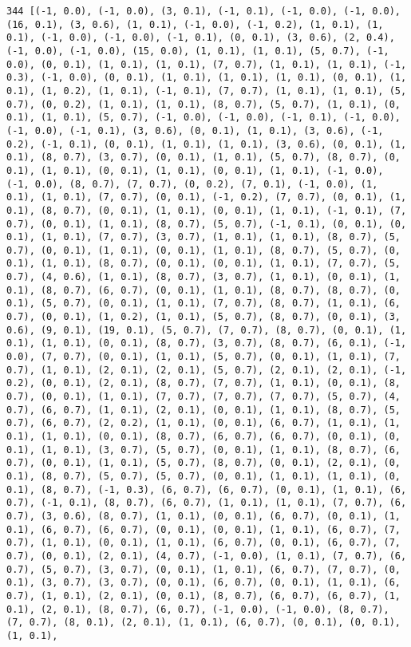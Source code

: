 \documentclass[11pt]{article}
\begin{document}
\begin{Verbatim}[commandchars=\\\{\}]
344 [(-1, 0.0), (-1, 0.0), (3, 0.1), (-1, 0.1), (-1, 0.0), (-1, 0.0), (16, 0.1), (3, 0.6), (1, 0.1), (-1, 0.0), (-1, 0.2), (1, 0.1), (1, 0.1), (-1, 0.0), (-1, 0.0), (-1, 0.1), (0, 0.1), (3, 0.6), (2, 0.4), (-1, 0.0), (-1, 0.0), (15, 0.0), (1, 0.1), (1, 0.1), (5, 0.7), (-1, 0.0), (0, 0.1), (1, 0.1), (1, 0.1), (7, 0.7), (1, 0.1), (1, 0.1), (-1, 0.3), (-1, 0.0), (0, 0.1), (1, 0.1), (1, 0.1), (1, 0.1), (0, 0.1), (1, 0.1), (1, 0.2), (1, 0.1), (-1, 0.1), (7, 0.7), (1, 0.1), (1, 0.1), (5, 0.7), (0, 0.2), (1, 0.1), (1, 0.1), (8, 0.7), (5, 0.7), (1, 0.1), (0, 0.1), (1, 0.1), (5, 0.7), (-1, 0.0), (-1, 0.0), (-1, 0.1), (-1, 0.0), (-1, 0.0), (-1, 0.1), (3, 0.6), (0, 0.1), (1, 0.1), (3, 0.6), (-1, 0.2), (-1, 0.1), (0, 0.1), (1, 0.1), (1, 0.1), (3, 0.6), (0, 0.1), (1, 0.1), (8, 0.7), (3, 0.7), (0, 0.1), (1, 0.1), (5, 0.7), (8, 0.7), (0, 0.1), (1, 0.1), (0, 0.1), (1, 0.1), (0, 0.1), (1, 0.1), (-1, 0.0), (-1, 0.0), (8, 0.7), (7, 0.7), (0, 0.2), (7, 0.1), (-1, 0.0), (1, 0.1), (1, 0.1), (7, 0.7), (0, 0.1), (-1, 0.2), (7, 0.7), (0, 0.1), (1, 0.1), (8, 0.7), (0, 0.1), (1, 0.1), (0, 0.1), (1, 0.1), (-1, 0.1), (7, 0.7), (0, 0.1), (1, 0.1), (8, 0.7), (5, 0.7), (-1, 0.1), (0, 0.1), (0, 0.1), (1, 0.1), (7, 0.7), (3, 0.7), (1, 0.1), (1, 0.1), (8, 0.7), (5, 0.7), (0, 0.1), (1, 0.1), (0, 0.1), (1, 0.1), (8, 0.7), (5, 0.7), (0, 0.1), (1, 0.1), (8, 0.7), (0, 0.1), (0, 0.1), (1, 0.1), (7, 0.7), (5, 0.7), (4, 0.6), (1, 0.1), (8, 0.7), (3, 0.7), (1, 0.1), (0, 0.1), (1, 0.1), (8, 0.7), (6, 0.7), (0, 0.1), (1, 0.1), (8, 0.7), (8, 0.7), (0, 0.1), (5, 0.7), (0, 0.1), (1, 0.1), (7, 0.7), (8, 0.7), (1, 0.1), (6, 0.7), (0, 0.1), (1, 0.2), (1, 0.1), (5, 0.7), (8, 0.7), (0, 0.1), (3, 0.6), (9, 0.1), (19, 0.1), (5, 0.7), (7, 0.7), (8, 0.7), (0, 0.1), (1, 0.1), (1, 0.1), (0, 0.1), (8, 0.7), (3, 0.7), (8, 0.7), (6, 0.1), (-1, 0.0), (7, 0.7), (0, 0.1), (1, 0.1), (5, 0.7), (0, 0.1), (1, 0.1), (7, 0.7), (1, 0.1), (2, 0.1), (2, 0.1), (5, 0.7), (2, 0.1), (2, 0.1), (-1, 0.2), (0, 0.1), (2, 0.1), (8, 0.7), (7, 0.7), (1, 0.1), (0, 0.1), (8, 0.7), (0, 0.1), (1, 0.1), (7, 0.7), (7, 0.7), (7, 0.7), (5, 0.7), (4, 0.7), (6, 0.7), (1, 0.1), (2, 0.1), (0, 0.1), (1, 0.1), (8, 0.7), (5, 0.7), (6, 0.7), (2, 0.2), (1, 0.1), (0, 0.1), (6, 0.7), (1, 0.1), (1, 0.1), (1, 0.1), (0, 0.1), (8, 0.7), (6, 0.7), (6, 0.7), (0, 0.1), (0, 0.1), (1, 0.1), (3, 0.7), (5, 0.7), (0, 0.1), (1, 0.1), (8, 0.7), (6, 0.7), (0, 0.1), (1, 0.1), (5, 0.7), (8, 0.7), (0, 0.1), (2, 0.1), (0, 0.1), (8, 0.7), (5, 0.7), (5, 0.7), (0, 0.1), (1, 0.1), (1, 0.1), (0, 0.1), (8, 0.7), (-1, 0.3), (6, 0.7), (6, 0.7), (0, 0.1), (1, 0.1), (6, 0.7), (-1, 0.1), (8, 0.7), (6, 0.7), (1, 0.1), (1, 0.1), (7, 0.7), (6, 0.7), (3, 0.6), (8, 0.7), (1, 0.1), (0, 0.1), (6, 0.7), (0, 0.1), (1, 0.1), (6, 0.7), (6, 0.7), (0, 0.1), (0, 0.1), (1, 0.1), (6, 0.7), (7, 0.7), (1, 0.1), (0, 0.1), (1, 0.1), (6, 0.7), (0, 0.1), (6, 0.7), (7, 0.7), (0, 0.1), (2, 0.1), (4, 0.7), (-1, 0.0), (1, 0.1), (7, 0.7), (6, 0.7), (5, 0.7), (3, 0.7), (0, 0.1), (1, 0.1), (6, 0.7), (7, 0.7), (0, 0.1), (3, 0.7), (3, 0.7), (0, 0.1), (6, 0.7), (0, 0.1), (1, 0.1), (6, 0.7), (1, 0.1), (2, 0.1), (0, 0.1), (8, 0.7), (6, 0.7), (6, 0.7), (1, 0.1), (2, 0.1), (8, 0.7), (6, 0.7), (-1, 0.0), (-1, 0.0), (8, 0.7), (7, 0.7), (8, 0.1), (2, 0.1), (1, 0.1), (6, 0.7), (0, 0.1), (0, 0.1), (1, 0.1), 
\end{Verbatim}
\end{document}
